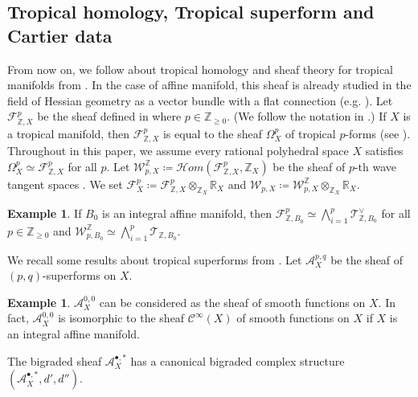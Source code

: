 \documentclass[a4paper,dvipdfmx,reqno,12pt]{amsart}
\theoremstyle{definition}
\newtheorem{example}[theorem]{Example}
\newcommand{\deq}{\coloneqq}
\numberwithin{equation}{section}
\begin{document}
\subsection{Tropical homology, Tropical superform and Cartier data}
From now on, we follow about tropical homology and sheaf 
theory for tropical manifolds
from \cite{mikhalkinTropicalEigenwaveIntermediate2014a,
MR3903579,gross2019sheaftheoretic}.
In the case of affine manifold, this sheaf is already
studied in the field of Hessian geometry as a vector bundle
with a flat connection
(e.g. \cite[Chapter 7]{MR2293045}).
Let $\mathcal{F}^{p}_{\mathbb{Z},X}$ be 
the sheaf defined in 
\cite[2.4]{mikhalkinTropicalEigenwaveIntermediate2014a}
where $p\in \mathbb{Z}_{\geq 0}$.
 (We follow the notation in \cite[Definition 2.4]{MR3894860}.)
If $X$ is a tropical manifold, then 
$\mathcal{F}^{p}_{\mathbb{Z},X}$ is equal 
to the sheaf $\Omega_{X}^{p}$ of tropical $p$-forms 
\cite[Definition 2.7]{gross2019sheaftheoretic}
(see \cite[Remark 2.8]{gross2019sheaftheoretic}).
Throughout in this paper, we assume every rational polyhedral space $X$
satisfies $\Omega_X^{p}\simeq \mathcal{F}_{\mathbb{Z},X}^{p}$
for all $p$.
Let $\mathcal{W}_{p,X}^{\mathbb{Z}}
\deq \mathcal{H}om(\mathcal{F}^{p}_{\mathbb{Z},X},\mathbb{Z}_X)$
be the sheaf of $p$-th wave tangent spaces 
\cite{yamamotoTropicalContractionsIntegral2021,mikhalkinTropicalEigenwaveIntermediate2014a}.
We set $\mathcal{F}^{p}_{X}\deq 
\mathcal{F}^{p}_{\mathbb{Z}, X}
\otimes_{\mathbb{Z}_X}\mathbb{R}_X$ and 
$\mathcal{W}_{p,X}\deq 
\mathcal{W}_{p,X}^{\mathbb{Z}}
\otimes_{\mathbb{Z}_X}\mathbb{R}_X$.



\begin{example}
If $B_0$ is an integral affine manifold, then 
$\mathcal{F}^{p}_{\mathbb{Z},B_0}\simeq 
\bigwedge^{p}_{i=1} \mathcal{T}_{\mathbb{Z},B_0}^{\vee}$ for 
all $p\in \mathbb{Z}_{\geq 0}$ and
$\mathcal{W}^{\mathbb{Z}}_{p,B_0}\simeq 
\bigwedge_{i=1}^{p}\mathcal{T}_{\mathbb{Z},B_0}$.
\end{example}

 

We recall some results about tropical superforms from
\cite{MR3903579,smacka2017differential}.
Let $\mathcal{A}^{p,q}_X$ be the sheaf of 
$(p,q)$-superforms on $X$. 
\begin{example}
$\mathcal{A}_X^{0,0}$ can be considered as the 
sheaf of smooth functions on $X$.
In fact, $\mathcal{A}_X^{0,0}$ is isomorphic to 
the sheaf $\mathcal{C}^{\infty}(X)$ of smooth functions 
on $X$ if $X$ is an integral affine manifold.
\end{example}
The bigraded sheaf $\mathcal{A}_X^{\bullet,*}$ has 
a canonical bigraded
complex structure
$(\mathcal{A}_X^{\bullet,*},d',d'')$.
\end{document}
